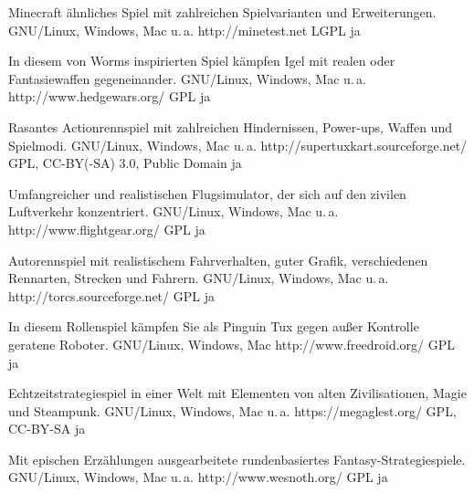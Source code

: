 



{Minecraft ähnliches Spiel mit zahlreichen Spielvarianten und Erweiterungen.}
{GNU/Linux, Windows, Mac u.\,a.}
{http://minetest.net}
{LGPL}
{ja}

{In diesem von Worms inspirierten Spiel kämpfen Igel mit realen oder Fantasiewaffen gegeneinander.}
{GNU/Linux, Windows, Mac u.\,a.}
{http://www.hedgewars.org/}
{GPL}
{ja}

{Rasantes Actionrennspiel mit zahlreichen Hindernissen, Power-ups, Waffen und Spielmodi.}
{GNU/Linux, Windows, Mac u.\,a.}
{http://supertuxkart.sourceforge.net/}
{GPL, CC-BY(-SA) 3.0, Public Domain}
{ja} 	%

{Umfangreicher und realistischen Flugsimulator, der sich auf den zivilen Luftverkehr konzentriert.}
{GNU/Linux, Windows, Mac u.\,a.}
{http://www.flightgear.org/}
{GPL}
{ja}

{Autorennspiel mit realistischem Fahrverhalten, guter Grafik, verschiedenen Rennarten, Strecken und Fahrern.}
{GNU/Linux, Windows, Mac u.\,a.}
{http://torcs.sourceforge.net/}
{GPL}
{ja} %


{In diesem Rollenspiel kämpfen Sie als Pinguin Tux gegen außer Kontrolle geratene Roboter.}
{GNU/Linux, Windows, Mac}
{http://www.freedroid.org/}
{GPL}
{ja} %

{Echtzeitstrategiespiel in einer Welt mit Elementen von alten Zivilisationen, Magie und Steampunk.}
{GNU/Linux, Windows, Mac u.\,a.}
{https://megaglest.org/}
{GPL, CC-BY-SA}
{ja}

{Mit epischen Erzählungen ausgearbeitete rundenbasiertes Fantasy-Strategiespiele.}
{GNU/Linux, Windows, Mac u.\,a.}
{http://www.wesnoth.org/}
{GPL}
{ja}

\backpage


